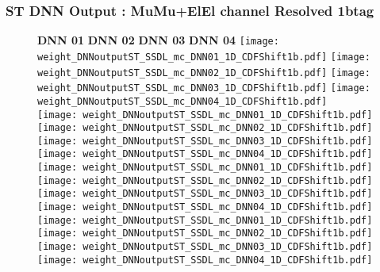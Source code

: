 \documentclass[9pt]{beamer}
\begin{document}
\begin{frame}
	\frametitle{ST DNN Output : MuMu+ElEl channel Resolved 1btag}
	\begin{figure}
	    \textbf{DNN 01} \hspace{1.2cm} \textbf{DNN 02} \hspace{1.2cm} \textbf{DNN 03} \hspace{1.2cm} \textbf{DNN 04}
        \centering
		\texttt{[image: weight\_DNNoutputST\_SSDL\_mc\_DNN01\_1D\_CDFShift1b.pdf]}
		\texttt{[image: weight\_DNNoutputST\_SSDL\_mc\_DNN02\_1D\_CDFShift1b.pdf]}
		\texttt{[image: weight\_DNNoutputST\_SSDL\_mc\_DNN03\_1D\_CDFShift1b.pdf]}
		\texttt{[image: weight\_DNNoutputST\_SSDL\_mc\_DNN04\_1D\_CDFShift1b.pdf]}\\
		\texttt{[image: weight\_DNNoutputST\_SSDL\_mc\_DNN01\_1D\_CDFShift1b.pdf]}
		\texttt{[image: weight\_DNNoutputST\_SSDL\_mc\_DNN02\_1D\_CDFShift1b.pdf]}
		\texttt{[image: weight\_DNNoutputST\_SSDL\_mc\_DNN03\_1D\_CDFShift1b.pdf]}
		\texttt{[image: weight\_DNNoutputST\_SSDL\_mc\_DNN04\_1D\_CDFShift1b.pdf]}\\
		\texttt{[image: weight\_DNNoutputST\_SSDL\_mc\_DNN01\_1D\_CDFShift1b.pdf]}
		\texttt{[image: weight\_DNNoutputST\_SSDL\_mc\_DNN02\_1D\_CDFShift1b.pdf]}
		\texttt{[image: weight\_DNNoutputST\_SSDL\_mc\_DNN03\_1D\_CDFShift1b.pdf]}
		\texttt{[image: weight\_DNNoutputST\_SSDL\_mc\_DNN04\_1D\_CDFShift1b.pdf]}\\
		\texttt{[image: weight\_DNNoutputST\_SSDL\_mc\_DNN01\_1D\_CDFShift1b.pdf]}
		\texttt{[image: weight\_DNNoutputST\_SSDL\_mc\_DNN02\_1D\_CDFShift1b.pdf]}
		\texttt{[image: weight\_DNNoutputST\_SSDL\_mc\_DNN03\_1D\_CDFShift1b.pdf]}
		\texttt{[image: weight\_DNNoutputST\_SSDL\_mc\_DNN04\_1D\_CDFShift1b.pdf]}\\
	\end{figure}
\end{frame}
\end{document}
